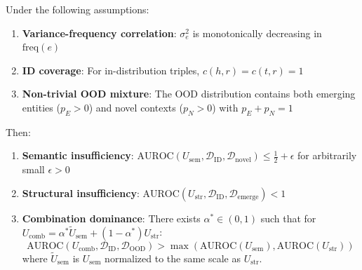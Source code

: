 \begin{theorem}[Complementarity]
\label{thm:complementarity}
Under the following assumptions:
\begin{enumerate}
    \item[(A1)] \textbf{Variance-frequency correlation}: $\sigma^2_e$ is monotonically decreasing in $\text{freq}(e)$
    \item[(A2)] \textbf{ID coverage}: For in-distribution triples, $c(h,r) = c(t,r) = 1$
    \item[(A3)] \textbf{Non-trivial OOD mixture}: The OOD distribution contains both emerging entities ($p_E > 0$) and novel contexts ($p_N > 0$) with $p_E + p_N = 1$
\end{enumerate}

Then:
\begin{enumerate}
    \item[(i)] \textbf{Semantic insufficiency}: $\text{AUROC}(U_{\text{sem}}, \mathcal{D}_{\text{ID}}, \mathcal{D}_{\text{novel}}) \leq \frac{1}{2} + \epsilon$ for arbitrarily small $\epsilon > 0$

    \item[(ii)] \textbf{Structural insufficiency}: $\text{AUROC}(U_{\text{str}}, \mathcal{D}_{\text{ID}}, \mathcal{D}_{\text{emerge}}) < 1$

    \item[(iii)] \textbf{Combination dominance}: There exists $\alpha^* \in (0,1)$ such that for $U_{\text{comb}} = \alpha^* \tilde{U}_{\text{sem}} + (1-\alpha^*) U_{\text{str}}$:
    \begin{equation}
        \text{AUROC}(U_{\text{comb}}, \mathcal{D}_{\text{ID}}, \mathcal{D}_{\text{OOD}}) > \max\left(\text{AUROC}(U_{\text{sem}}), \text{AUROC}(U_{\text{str}})\right)
    \end{equation}
    where $\tilde{U}_{\text{sem}}$ is $U_{\text{sem}}$ normalized to the same scale as $U_{\text{str}}$.
\end{enumerate}
\end{theorem}

